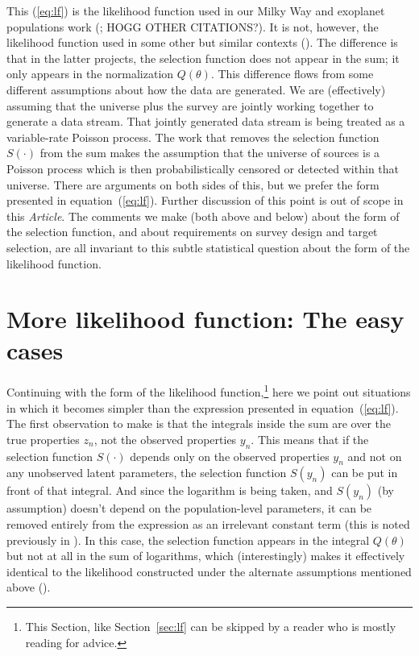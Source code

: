 \documentclass[modern]{aastex62}
\newcommand{\documentname}{\textsl{Article}}
\newcommand{\sectionname}{Section}
\newcommand{\equationname}{equation}
\begin{document}
This (\ref{eq:lf}) is the likelihood function used in our Milky Way
and exoplanet populations work (\citealt{bovy, exopop}; HOGG OTHER
CITATIONS?).
It is not, however, the likelihood function used in some other but
similar contexts (\citealt{loredogrb, loredo}).
The difference is that in the latter projects, the selection function
does not appear in the sum; it only appears in the normalization $Q(\theta)$.
This difference flows from some different assumptions about how the
data are generated.
We are (effectively) assuming that the universe plus the survey are jointly
working together to generate a data stream.
That jointly generated data stream is being treated as a variable-rate Poisson
process.
The work that removes the selection function $S(\cdot)$ from the sum
makes the assumption that the universe of sources is a Poisson process
which is then probabilistically censored or detected within that universe.
There are arguments on both sides of this, but we prefer the form
presented in \equationname~(\ref{eq:lf}).
Further discussion of this point is out of scope in this \documentname.
The comments we make (both above and below) about the form of the
selection function, and about requirements on survey design and target
selection, are all invariant to this subtle statistical question about
the form of the likelihood function.

\section{More likelihood function: The easy cases}\label{sec:easy}

Continuing with the form of the likelihood function,\footnote{This
  \sectionname, like \sectionname~\ref{sec:lf} can be skipped by a
  reader who is mostly reading for advice.} here we point out
situations in which it becomes simpler than the expression presented
in equation~(\ref{eq:lf}).
The first observation to make is that the integrals inside the sum are
over the true properties $z_n$, not the observed properties $y_n$.
This means that if the selection function $S(\cdot)$ depends only on
the observed properties $y_n$ and not on any unobserved latent parameters,
the selection function $S(y_n)$ can be put in front of that integral.
And since the logarithm is being taken, and $S(y_n)$ (by assumption)
doesn't depend on the population-level parameters, it can be removed
entirely from the expression as an irrelevant constant term (this is
noted previously in \citealt{bovy}).
In this case, the selection function appears in the integral
$Q(\theta)$ but not at all in the sum of logarithms, which
(interestingly) makes it effectively identical to the likelihood
constructed under the alternate assumptions mentioned above
(\citealt{loredo}).
\end{document}
